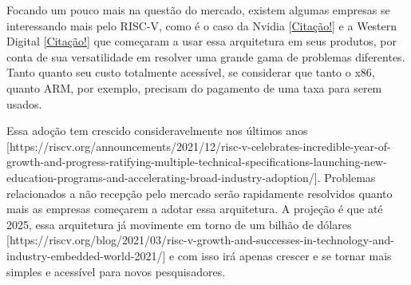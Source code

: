 Focando um pouco mais na questão do mercado, existem algumas empresas se interessando mais pelo RISC-V, 
como é o caso da Nvidia [\href{https://riscv.org/wp-content/uploads/2016/07/Tue1100_Nvidia_RISCV_Story_V2.pdf}{Citação!}] 
e a Western Digital [\href{https://www.westerndigital.com/pt-br/solutions/risc-v}{Citação!}] que começaram a usar essa 
arquitetura em seus produtos, por conta de sua versatilidade em resolver uma grande gama de problemas 
diferentes. Tanto quanto seu custo totalmente acessível, se considerar que tanto o x86, quanto ARM, 
por exemplo, precisam do pagamento de uma taxa para serem usados.

Essa adoção tem crescido consideravelmente nos últimos anos 
[https://riscv.org/announcements/2021/12/risc-v-celebrates-incredible-year-of-growth-and-progress-ratifying-multiple-technical-specifications-launching-new-education-programs-and-accelerating-broad-industry-adoption/]. 
Problemas relacionados a não recepção pelo mercado serão rapidamente resolvidos quanto mais as empresas começarem 
a adotar essa arquitetura. A projeção é que até 2025, essa arquitetura já movimente em torno de um bilhão de 
dólares [https://riscv.org/blog/2021/03/risc-v-growth-and-successes-in-technology-and-industry-embedded-world-2021/] 
e com isso irá apenas crescer e se tornar mais simples e acessível para novos pesquisadores.
